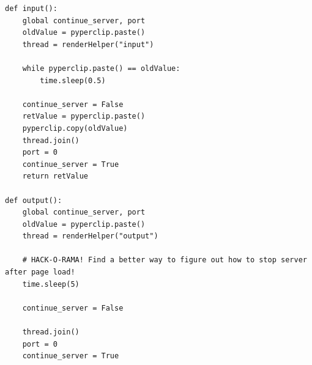 \documentclass[a4paper]{article}
\begin{document}
\begin{verbatim}
def input():
    global continue_server, port
    oldValue = pyperclip.paste()
    thread = renderHelper("input")

    while pyperclip.paste() == oldValue:
        time.sleep(0.5)

    continue_server = False
    retValue = pyperclip.paste()
    pyperclip.copy(oldValue)
    thread.join()
    port = 0
    continue_server = True
    return retValue

def output():
    global continue_server, port
    oldValue = pyperclip.paste()
    thread = renderHelper("output")

    # HACK-O-RAMA! Find a better way to figure out how to stop server after page load!
    time.sleep(5)

    continue_server = False
    
    thread.join()
    port = 0
    continue_server = True
\end{verbatim}
\end{document}
